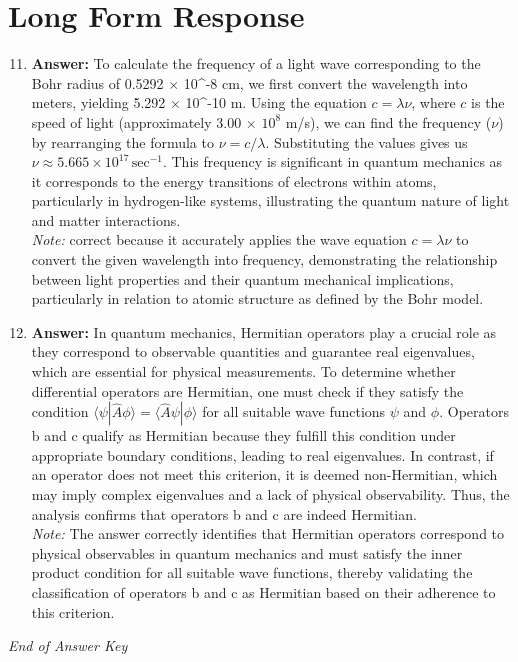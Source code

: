 \documentclass[12pt]{article}
\begin{document}
\section*{Long Form Response}
\begin{enumerate}[label=\arabic*.]
\setcounter{enumi}{10}
\item \textbf{Answer:} To calculate the frequency of a light wave corresponding to the Bohr radius of 0.5292 \ensuremath{\times} 10^-8 cm, we first convert the wavelength into meters, yielding 5.292 \ensuremath{\times} 10^-10 m. Using the equation \(c = \lambda \nu\), where \(c\) is the speed of light (approximately 3.00 \ensuremath{\times} $10^8$ m/s), we can find the frequency (\(\nu\)) by rearranging the formula to \(\nu = c / \lambda\). Substituting the values gives us \(\nu \approx 5.665 \times 10^{17} \, \text{sec}^{-1}\). This frequency is significant in quantum mechanics as it corresponds to the energy transitions of electrons within atoms, particularly in hydrogen-like systems, illustrating the quantum nature of light and matter interactions.
\\ \textit{Note:} correct because it accurately applies the wave equation \(c = \lambda \nu\) to convert the given wavelength into frequency, demonstrating the relationship between light properties and their quantum mechanical implications, particularly in relation to atomic structure as defined by the Bohr model.
\item \textbf{Answer:} In quantum mechanics, Hermitian operators play a crucial role as they correspond to observable quantities and guarantee real eigenvalues, which are essential for physical measurements. To determine whether differential operators are Hermitian, one must check if they satisfy the condition \( \langle \psi | \hat{A} \phi \rangle = \langle \hat{A} \psi | \phi \rangle \) for all suitable wave functions \( \psi \) and \( \phi \). Operators b and c qualify as Hermitian because they fulfill this condition under appropriate boundary conditions, leading to real eigenvalues. In contrast, if an operator does not meet this criterion, it is deemed non-Hermitian, which may imply complex eigenvalues and a lack of physical observability. Thus, the analysis confirms that operators b and c are indeed Hermitian.
\\ \textit{Note:} The answer correctly identifies that Hermitian operators correspond to physical observables in quantum mechanics and must satisfy the inner product condition for all suitable wave functions, thereby validating the classification of operators b and c as Hermitian based on their adherence to this criterion.
\end{enumerate}

\vfill
\noindent\textit{End of Answer Key}
\end{document}
